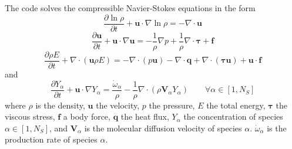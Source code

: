 \documentclass[notitlepage]{revtex4-1}
\begin{document}
The code solves the compressible Navier-Stokes equations in the form
\begin{equation}\frac{\partial\ln\rho}{\partial{t}}+\bm{u}\cdot\nabla\ln\rho=-\nabla\cdot\bm{u}\label{eq:mass}\end{equation}
\begin{equation}\frac{\partial\bm{u}}{\partial{t}}+\bm{u}\cdot\nabla\bm{u}=-\frac{1}{\rho}\nabla{p}+\frac{1}{\rho}\nabla\cdot\bm{\tau}+\bm{f}\label{eq:mom}\end{equation}
\begin{equation}\frac{\partial\rho{E}}{\partial{t}}+\nabla\cdot\left(\bm{u}\rho{E}\right)=-\nabla\cdot\left(p\bm{u}\right)-\nabla\cdot\bm{q}+\nabla\cdot\left(\bm{\tau}\bm{u}\right)+\bm{u}\cdot\bm{f}\label{eq:en}\end{equation}
and
\begin{equation}\frac{\partial{Y}_{\alpha}}{\partial{t}}+\bm{u}\cdot\nabla{Y}_{\alpha}=\frac{\dot\omega_{\alpha}}{\rho}-\frac{1}{\rho}\nabla\cdot\left(\rho\bm{V}_{\alpha}Y_{\alpha}\right)\qquad\forall\alpha\in\left[1,N_{S}\right]\label{eq:Y}\end{equation}
where $\rho$ is the density, $\bm{u}$ the velocity, $p$ the pressure, $E$ the total energy, $\bm{\tau}$ the viscous stress, $\bm{f}$ a body force, $\bm{q}$ the heat flux, $Y_{\alpha}$ the concentration of species $\alpha\in\left[1,N_{S}\right]$, and $\bm{V}_{\alpha}$ is the molecular diffusion velocity of species $\alpha$. $\dot\omega_{\alpha}$ is the production rate of species $\alpha$.
\end{document}
